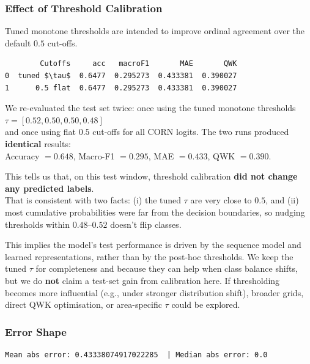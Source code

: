 \documentclass[
  letterpaper,
  DIV=11,
  numbers=noendperiod]{scrartcl}
\begin{document}
\subsubsection{Effect of Threshold
Calibration}\label{effect-of-threshold-calibration}

Tuned monotone thresholds are intended to improve ordinal agreement over
the default \(0.5\) cut-offs.

\begin{verbatim}
        Cutoffs     acc   macroF1       MAE       QWK
0  tuned $\tau$  0.6477  0.295273  0.433381  0.390027
1      0.5 flat  0.6477  0.295273  0.433381  0.390027
\end{verbatim}

We re-evaluated the test set twice: once using the tuned monotone
thresholds \(\tau = [0.52, 0.50, 0.50, 0.48]\)\\
and once using flat \(0.5\) cut-offs for all CORN logits. The two runs
produced \textbf{identical} results:\\
Accuracy \(= 0.648\), Macro-F1 \(= 0.295\), MAE \(= 0.433\), QWK
\(= 0.390\).

This tells us that, on this test window, threshold calibration
\textbf{did not change any predicted labels}.\\
That is consistent with two facts: (i) the tuned \(\tau\) are very close
to \(0.5\), and (ii) most cumulative probabilities were far from the
decision boundaries, so nudging thresholds within \(0.48\)--\(0.52\)
doesn't flip classes.

This implies the model's test performance is driven by the sequence
model and learned representations, rather than by the post-hoc
thresholds. We keep the tuned \(\tau\) for completeness and because they
can help when class balance shifts, but we do \textbf{not} claim a
test-set gain from calibration here. If thresholding becomes more
influential (e.g., under stronger distribution shift), broader grids,
direct QWK optimisation, or area-specific \(\tau\) could be explored.

\subsubsection{Error Shape}\label{error-shape}

\begin{verbatim}
Mean abs error: 0.43338074917022285  | Median abs error: 0.0
\end{verbatim}
\end{document}
